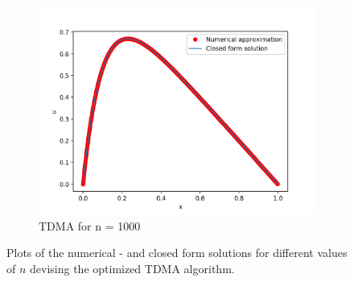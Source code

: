 \documentclass[a4paper, english]{amsart} %
\begin{document}
\begin{figure}[H]
\begin{subfigure}[b]{0.3\linewidth}
		\includegraphics[width=\linewidth]{Figur/TDMA_1000.png}
		\caption{TDMA for n = 1000}
		\label{Fig_TDMA1000}
	\end{subfigure}
	\caption{Plots of the numerical - and closed form solutions for different values of $n$ devising the optimized TDMA algorithm.}
	\label{Fig_TDMA}
\end{figure}
\end{document}
